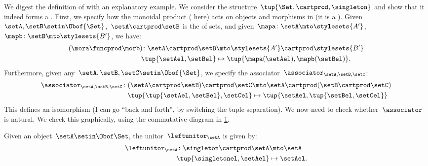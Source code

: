 \begin{example}
    We digest the definition of  with an explanatory example.
    We consider the structure~$\tup{\Set,\cartprod,\singleton}$ and show that it indeed forms a .
    First, we specify how the monoidal product ( here) acts on objects and morphisms in \Set (it is a ).
    Given~$\setA,\setB\setin \Obof{\Set}$,~$\setA\cartprod \setB$ is the  of sets, and given~$\mapa\colon \setA\mto \stylesets{A'}$,~$\mapb\colon \setB\mto \stylesets{B'}$, we have:
    \begin{equation}
        \label{eq:set_mon_prod_2}
        \begin{aligned}
            (\mora \funcprod \morb)
            \colon \setA\cartprod \setB & \mto \stylesets{A'}\cartprod \stylesets{B'} \\
            \tup{\setAel,\setBel}       & \mapsto \tup{\mapa(\setAel),\mapb(\setBel)}.
        \end{aligned}
    \end{equation}
    Furthermore, given any~$\setA,\setB,\setC\setin \Obof{\Set}$, we specify the associator~$\associator_{\setA,\setB,\setC}$:
    \begin{equation}
        \label{eq:set_mon_prod_3}
        \begin{aligned}
            \associator_{\setA,\setB,\setC}\colon (\setA\cartprod \setB)\cartprod \setC & \mto \setA\cartprod (\setB\cartprod \setC) \\
            \tup{\tup{\setAel,\setBel},\setCel}                                         & \mapsto \tup{\setAel, \tup{\setBel,\setCel}}
        \end{aligned}
    \end{equation}
    This defines an isomorphism (I can go ``back and forth'', by switching the tuple separation).
    We now need to check whether~$\associator$ is natural.
    We check this graphically, using the commutative diagram in \cref{fig:monoidal_set_ass_nat}.

    \begin{figure}[h!]
        \centering
        \caption{}
        \label{fig:monoidal_set_ass_nat}
    \end{figure}

    Given an object~$\setA\setin \Obof\Set$, the unitor~$\leftunitor_\setA$ is given by:
    \begin{equation}
        \label{eq:set_mon_prod_4}
        \begin{aligned}
            \leftunitor_\setA\colon \singleton \cartprod \setA & \mto \setA \\
            \tup{\singletonel,\setAel}                         & \mapsto \setAel.
        \end{aligned}
    \end{equation}


\end{example}
